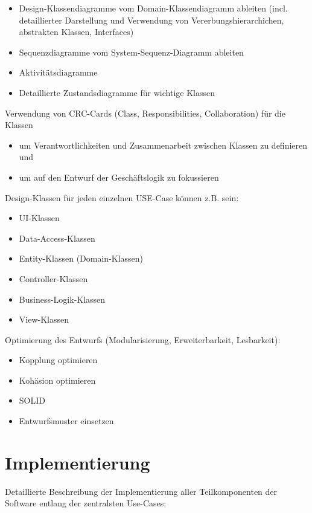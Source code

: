 \begin{itemize}
	\item Design-Klassendiagramme vom Domain-Klassendiagramm ableiten (incl. detaillierter Darstellung und Verwendung von Vererbungshierarchichen, abstrakten Klassen, Interfaces)
	\item Sequenzdiagramme vom System-Sequenz-Diagramm ableiten
	\item Aktivitätsdiagramme
	\item Detaillierte Zustandsdiagramme für wichtige Klassen
\end{itemize}

Verwendung von CRC-Cards (Class, Responsibilities, Collaboration) für die Klassen
\begin{itemize}
	\item um Verantwortlichkeiten und Zusammenarbeit zwischen Klassen zu definieren und
	\item um auf den Entwurf der Geschäftslogik zu fokussieren
\end{itemize}

Design-Klassen für jeden einzelnen USE-Case können z.B. sein:

\begin{itemize}
	\item UI-Klassen
	\item Data-Access-Klassen
	\item Entity-Klassen (Domain-Klassen)
	\item Controller-Klassen
	\item Business-Logik-Klassen
	\item View-Klassen
\end{itemize}

Optimierung des Entwurfs (Modularisierung, Erweiterbarkeit, Lesbarkeit):

\begin{itemize}
	\item Kopplung optimieren
	\item Kohäsion optimieren
	\item SOLID
	\item Entwurfsmuster einsetzen
\end{itemize}

\chapter{Implementierung}
Detaillierte Beschreibung der Implementierung aller Teilkomponenten der Software entlang der zentralsten Use-Cases:


